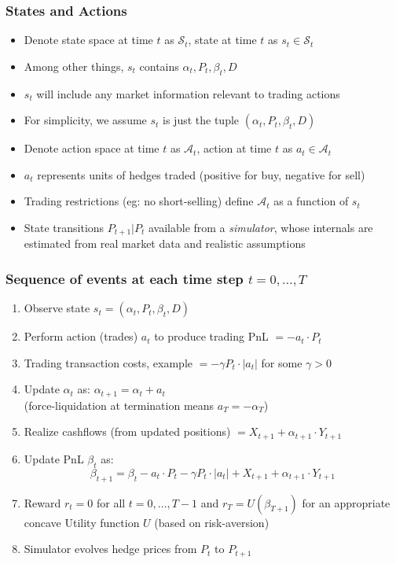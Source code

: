 \documentclass[handout]{beamer}
\begin{document}
\begin{frame}
\frametitle{States and Actions}
\pause
\begin{itemize}[<+->]
\item Denote state space at time $t$ as $\mathcal{S}_t$, state at time $t$ as $s_t \in \mathcal{S}_t$
\item Among other things, $s_t$ contains $\alpha_t, P_t, \beta_t, D$
\item $s_t$ will include any market information relevant to trading actions
\item For simplicity, we assume $s_t$ is just the tuple $(\alpha_t, P_t, \beta_t, D)$
\item Denote action space at time $t$ as $\mathcal{A}_t$, action at time $t$ as $a_t \in \mathcal{A}_t$
\item $a_t$ represents units of hedges traded (positive for buy, negative for sell)
\item Trading restrictions (eg: no short-selling) define $\mathcal{A}_t$ as a function of $s_t$
\item State transitions $P_{t+1}|P_t$ available from a {\em simulator}, whose internals are estimated from real market data and realistic assumptions
\end{itemize}
\end{frame}

\begin{frame}
\frametitle{Sequence of events at each time step $t=0, \ldots, T$}
\pause
\begin{enumerate}[<+->]
\item Observe state $s_t = (\alpha_t, P_t, \beta_t, D)$
\item Perform action (trades) $a_t$ to produce trading PnL $= - a_t \cdot P_t$
\item Trading transaction costs, example $= - \gamma P_t \cdot |a_t|$ for some $\gamma > 0$
\item Update $\alpha_t$ as: $\alpha_{t+1} = \alpha_t + a_t$ \\(force-liquidation at termination means $a_T= -\alpha_T$)
\item Realize cashflows (from updated positions) $=X_{t+1} + \alpha_{t+1} \cdot Y_{t+1}$
\item Update PnL $\beta_t$ as:
$$\beta_{t+1} = \beta_t - a_t \cdot P_t - \gamma P_t \cdot |a_t|  + X_{t+1} + \alpha_{t+1} \cdot Y_{t+1}$$
\item Reward $r_t = 0$ for all $t = 0, \ldots, T-1$ and $r_T = U(\beta_{T+1})$ for an appropriate concave Utility function $U$ (based on risk-aversion)
\item Simulator evolves hedge prices from $P_t$ to $P_{t+1}$
\end{enumerate}
\end{frame}
\end{document}
